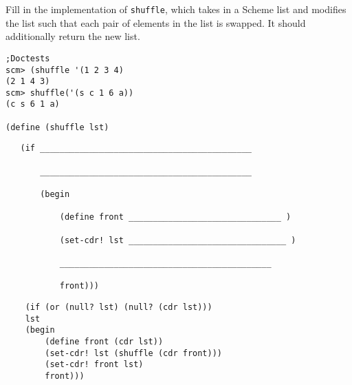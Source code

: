 \begin{blocksection}
\question Fill in the implementation of \lstinline$shuffle$, which takes in a Scheme list and modifies the list
such that each pair of elements in the list is swapped. It should additionally return the new list.

\begin{lstlisting}
;Doctests
scm> (shuffle '(1 2 3 4)
(2 1 4 3)
scm> shuffle('(s c 1 6 a))
(c s 6 1 a)

(define (shuffle lst)
\end{lstlisting}

\ifprintanswers\else
\begin{lstlisting}
   (if ___________________________________________

       ___________________________________________

       (begin 

           (define front _______________________________ )

           (set-cdr! lst ________________________________ )
 
           ___________________________________________

           front)))
\end{lstlisting}
\fi

\begin{solution}
\begin{lstlisting}
    (if (or (null? lst) (null? (cdr lst)))
	lst
	(begin
		(define front (cdr lst))
		(set-cdr! lst (shuffle (cdr front)))
		(set-cdr! front lst)
		front)))
\end{lstlisting}
\end{solution}
\end{blocksection}
